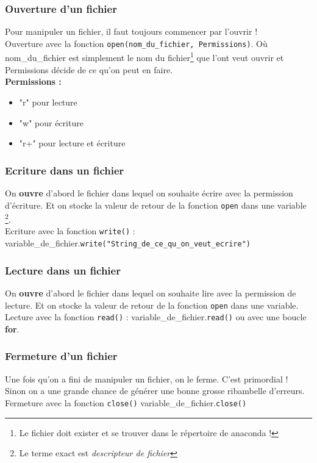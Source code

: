 \documentclass[handout]{beamer}
\begin{document}
\begin{frame}
\frametitle{Ouverture d'un fichier}
Pour manipuler un fichier, il faut toujours commencer par l'ouvrir ! \\
Ouverture avec la fonction \texttt{open(nom\_du\_fichier, Permissions)}. Où nom\_du\_fichier est simplement le nom du fichier\footnote{Le fichier doit exister et se trouver dans le répertoire de anaconda !} que l'ont veut ouvrir et Permissions décide de ce qu'on peut en faire.
\\
\textbf{Permissions : }
\begin{itemize}
\item "r" pour lecture
\item "w" pour écriture
\item "r+" pour lecture et écriture
\end{itemize}
\end{frame}
\begin{frame}
\frametitle{Ecriture dans un fichier}
On \textbf{ouvre} d'abord le fichier dans lequel on souhaite écrire avec la permission d'écriture. Et on stocke la valeur de retour de la fonction \texttt{open} dans une variable \footnote{Le terme exact est \textit{descripteur de fichier}}. \\
Ecriture avec la fonction \texttt{write()} :  variable\_de\_fichier.\texttt{write("String\_de\_ce\_qu\_on\_veut\_ecrire")}
\writing
\end{frame}
\begin{frame}
\frametitle{Lecture dans un fichier}
On \textbf{ouvre} d'abord le fichier dans lequel on souhaite lire avec la permission de lecture. Et on stocke la valeur de retour de la fonction \texttt{open} dans une variable. \\
Lecture avec la fonction \texttt{read()} :  variable\_de\_fichier.\texttt{read()} ou avec une boucle \textbf{for}.
\reading
\readingsecundo
\end{frame}
\begin{frame}
\frametitle{Fermeture d'un fichier}
Une fois qu'on a fini de manipuler un fichier, on le ferme. C'est primordial ! \\
Sinon on a une grande chance de générer une bonne grosse ribambelle d'erreurs.\\
Fermeture avec la fonction \texttt{close()} variable\_de\_fichier.\texttt{close()}
\end{frame}
\end{document}
